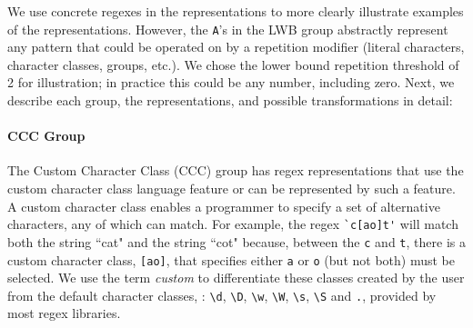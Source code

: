 We use concrete regexes in the representations to more clearly illustrate examples of the representations. However, the \verb!A!'s in the LWB group abstractly represent any pattern that could be operated on by a repetition modifier (literal characters, character classes, groups, etc.).   We chose the lower bound repetition threshold of  2 for illustration; in practice this could be any number, including zero.
Next, we describe each group, the representations, and possible transformations in detail:

\paragraph{CCC Group}
The Custom Character Class (CCC) group has regex representations that use the custom character class language feature or can be represented by such a feature.
 A custom character class enables a programmer to specify a set of alternative characters, any of which can match.  For example, the regex \verb!`c[ao]t'! will match both the string ``cat" and the string ``cot" because, between the \verb!c! and \verb!t!, there is a custom character class, \verb![ao]!, that specifies either \verb!a! or \verb!o! (but not both) must be selected.  We use the term \emph{custom} to differentiate these classes created by the user from the default character classes, : \verb!\d!, \verb!\D!, \verb!\w!, \verb!\W!, \verb!\s!, \verb!\S! and \verb!.!,  provided by most regex libraries.

